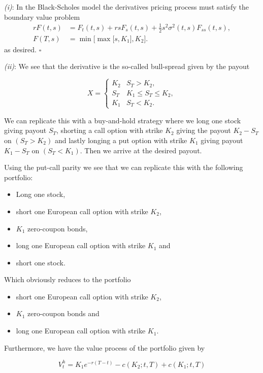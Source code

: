 \documentclass[a4paper,12pt,openany]{book}
\providecommand{\tightlist}{%
 \setlength{\itemsep}{0pt}\setlength{\parskip}{0pt}}
\begin{document}
\emph{(i)}: In the Black-Scholes model the derivatives pricing process must satisfy the boundary value problem
\begin{align*}
rF(t,s)&=F_t(t,s)+rsF_s(t,s)+\frac{1}{2}s^2\sigma^2(t,s)F_{ss}(t,s),\\
F(T,s)&=\min\Big[\max\Big[s,K_1\Big],K_2\Big].
\end{align*}
as desired. \(\square\)

\emph{(ii)}: We see that the derivative is the so-called bull-spread given by the payout

\[
X =
\begin{cases}
K_2 & S_T>K_2,\\
S_T & K_1\le S_T\le K_2,\\
K_1 & S_T<K_2.
\end{cases}
\]

We can replicate this with a buy-and-hold strategy where we long one stock giving payout \(S_T\), shorting a call option with strike \(K_2\) giving the payout \(K_2-S_T\) on \((S_T>K_2)\) and lastly longing a put option with strike \(K_1\) giving payout \(K_1-S_T\) on \((S_T<K_1)\). Then we arrive at the desired payout.

Using the put-call parity we see that we can replicate this with the following portfolio:

\begin{itemize}
\tightlist
\item
  Long one stock,
\item
  short one European call option with strike \(K_2\),
\item
  \(K_1\) zero-coupon bonds,
\item
  long one European call option with strike \(K_1\) and
\item
  short one stock.
\end{itemize}

Which obviously reduces to the portfolio

\begin{itemize}
\tightlist
\item
  short one European call option with strike \(K_2\),
\item
  \(K_1\) zero-coupon bonds and
\item
  long one European call option with strike \(K_1\).
\end{itemize}

Furthermore, we have the value process of the portfolio given by

\[
V^h_t=K_1e^{-r(T-t)}-c(K_2;t,T)+c(K_1;t,T)
\]
\end{document}
